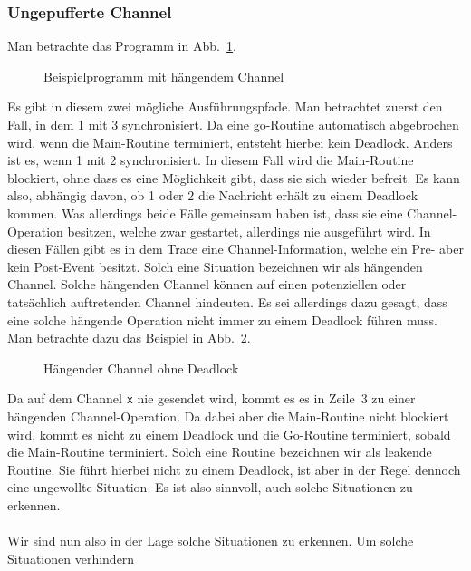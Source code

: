 \subsubsection{Ungepufferte Channel}\label{Chap:Analyze-Sec:Channel-SubSec:Dangling}
Man betrachte das Programm in Abb.~\ref{Chap:Analyze-Sec:Channel-SubSec:Dangling-Fig:ExDangling}.
\begin{figure}[h!]
  
  \caption{Beispielprogramm mit hängendem Channel}
  \label{Chap:Analyze-Sec:Channel-SubSec:Dangling-Fig:ExDangling}
\end{figure}
Es gibt in diesem zwei mögliche Ausführungspfade. Man betrachtet zuerst den Fall, in dem 1 mit 3 synchronisiert. 
Da eine go-Routine automatisch abgebrochen wird,  
wenn die Main-Routine terminiert, entsteht hierbei kein Deadlock. Anders ist es, wenn 1 mit 2 synchronisiert. 
In diesem Fall wird die Main-Routine blockiert, ohne dass es eine Möglichkeit gibt, dass sie sich wieder 
befreit. Es kann also, abhängig davon, ob 1 oder 2 die Nachricht erhält zu einem Deadlock kommen. Was 
allerdings beide Fälle gemeinsam haben ist, dass sie eine Channel-Operation besitzen, welche zwar 
gestartet, allerdings nie ausgeführt wird.
In diesen Fällen gibt es in dem Trace eine Channel-Information, 
welche ein Pre- aber kein Post-Event besitzt. Solch eine Situation bezeichnen wir als hängenden Channel. 
Solche hängenden 
Channel können auf einen potenziellen oder tatsächlich auftretenden Channel hindeuten.
Es sei allerdings dazu gesagt, dass eine solche hängende Operation nicht immer zu einem Deadlock führen muss.
Man betrachte dazu das Beispiel in Abb.~\ref{Chap:Analyze-Sec:Channel-SubSec:Dangling-Fig:ExDanglingWithout}.
\begin{figure}[h!]
  
  \caption{Hängender Channel ohne Deadlock}
  \label{Chap:Analyze-Sec:Channel-SubSec:Dangling-Fig:ExDanglingWithout}
\end{figure}
Da auf dem Channel \texttt{x} nie gesendet wird, kommt es es in Zeile~3 zu einer hängenden Channel-Operation. Da 
dabei aber die Main-Routine nicht blockiert wird, kommt es nicht zu einem Deadlock und die Go-Routine 
terminiert, sobald die Main-Routine terminiert. Solch eine Routine bezeichnen wir als leakende Routine.
Sie führt hierbei nicht zu einem Deadlock, ist aber in der Regel dennoch eine ungewollte Situation.
Es ist also sinnvoll, auch solche Situationen zu erkennen.\\\\
Wir sind nun also in der Lage solche Situationen zu erkennen. Um solche Situationen verhindern 
